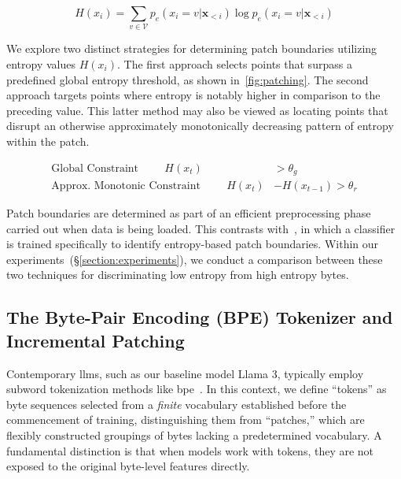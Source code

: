 \begin{equation}
H(x_i) = \sum_{v \in \mathcal{V}} p_{e}(x_i=v|\pmb{x}_{<i}) \log p_{e}(x_i=v|\pmb{x}_{<i})
\end{equation}

We explore two distinct strategies for determining patch boundaries utilizing entropy values $H(x_i)$. The first approach selects points that surpass a predefined global entropy threshold, as shown in~\autoref{fig:patching}. The second approach targets points where entropy is notably higher in comparison to the preceding value. This latter method may also be viewed as locating points that disrupt an otherwise approximately monotonically decreasing pattern of entropy within the patch.

\begin{align*}
    \text{Global Constraint}\hspace{1cm}H(x_t)& > \theta_g\\
    \text{Approx. Monotonic Constraint}\hspace{1cm}H(x_t)& - H(x_{t-1}) > \theta_r
\end{align*}

Patch boundaries are determined as part of an efficient preprocessing phase carried out when data is being loaded. This contrasts with~\citet{nawrot-etal-2023-efficient}, in which a classifier is trained specifically to identify entropy-based patch boundaries. Within our experiments~(\S\ref{section:experiments}), we conduct a comparison between these two techniques for discriminating low entropy from high entropy bytes.

\subsection{The Byte-Pair Encoding (BPE) Tokenizer and Incremental Patching}
\label{section:incremental-patching}
\label{section:bpe-patch}

Contemporary llms, such as our baseline model Llama 3, typically employ subword tokenization methods like bpe~\citep{gage1994new, sennrich-etal-2016-neural}. In this context, we define ``tokens'' as byte sequences selected from a \textit{finite} vocabulary established before the commencement of training, distinguishing them from ``patches,'' which are flexibly constructed groupings of bytes lacking a predetermined vocabulary. A fundamental distinction is that when models work with tokens, they are not exposed to the original byte-level features directly.

